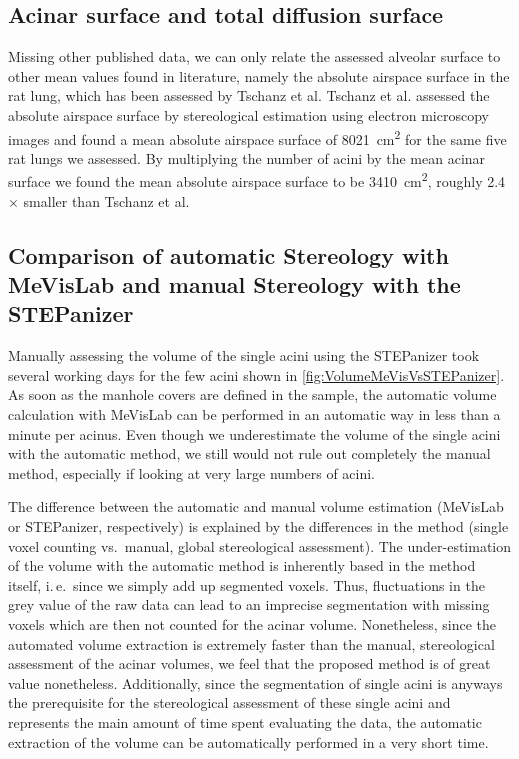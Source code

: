 \documentclass[twoside,paper=a4,abstract=true,english,DIV=calc]{scrartcl}
\newcommand{\ie}{i.\,e.\ }
\begin{document}
\subsection{Acinar surface and total diffusion surface}
Missing other published data, we can only relate the assessed alveolar surface to other mean values found in literature, namely the absolute airspace surface in the rat lung, which has been assessed by Tschanz et al. Tschanz et al. assessed the absolute airspace surface by stereological estimation using electron microscopy images and found a mean absolute airspace surface of \SI{8021}{\centi\metre\squared} for the same five rat lungs we assessed. By multiplying the number of acini by the mean acinar surface we found the mean absolute airspace surface to be \SI{3410}{\centi\metre\squared}, roughly 2.4\(\times\) smaller than Tschanz et al.

\subsection[Comparison of MeVisLab with STEPanizer]{Comparison of automatic Stereology with MeVisLab and manual Stereology with the STEPanizer}
Manually assessing the volume of the single acini using the STEPanizer took several working days for the few acini shown in \autoref{fig:VolumeMeVisVsSTEPanizer}. As soon as the manhole covers are defined in the sample, the automatic volume calculation with MeVisLab can be performed in an automatic way in less than a minute per acinus. Even though we underestimate the volume of the single acini with the automatic method, we still would not rule out completely the manual method, especially if looking at very large numbers of acini.

The difference between the automatic and manual volume estimation (MeVisLab or STEPanizer, respectively) is explained by the differences in the method (single voxel counting vs.\ manual, global stereological assessment). The under-estimation of the volume with the automatic method is inherently based in the method itself, \ie since we simply add up segmented voxels. Thus, fluctuations in the grey value of the raw data can lead to an imprecise segmentation with missing voxels which are then not counted for the acinar volume. Nonetheless, since the automated volume extraction is extremely faster than the manual, stereological assessment of the acinar volumes, we feel that the proposed method is of great value nonetheless. Additionally, since the segmentation of single acini is anyways the prerequisite for the stereological assessment of these single acini and represents the main amount of time spent evaluating the data, the automatic extraction of the volume can be automatically performed in a very short time.
\end{document}
